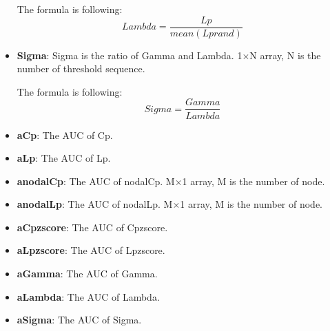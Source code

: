 \documentclass[11pt]{article}
\begin{document}
\begin{itemize}
						The formula is following:
						$$Lambda=\frac{Lp}{mean(Lprand)}$$
					\item \textbf{Sigma}: Sigma is the ratio of Gamma and Lambda.
						1$\times$N array, N is the number of threshold sequence.
						
						The formula is following:
						$$Sigma=\frac{Gamma}{Lambda}$$
					\item \textbf{aCp}: The AUC of Cp.
					\item \textbf{aLp}: The AUC of Lp.
					\item \textbf{anodalCp}: The AUC of nodalCp.
						M$\times$1 array, M is the number of node.
					\item \textbf{anodalLp}: The AUC of nodalLp.
						M$\times$1 array, M is the number of node.
					\item \textbf{aCpzscore}: The AUC of Cpzscore.
					\item \textbf{aLpzscore}: The AUC of Lpzscore.
					\item \textbf{aGamma}: The AUC of Gamma.
					\item \textbf{aLambda}: The AUC of Lambda.
					\item \textbf{aSigma}: The AUC of Sigma.
				\end{itemize}
\end{document}
